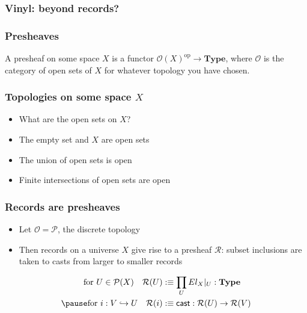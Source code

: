 \documentclass[tikz, 12pt]{beamer}
\begin{document}
\begin{frame}
  \frametitle{Vinyl: beyond records?}
\end{frame}

\begin{frame}
  \frametitle{Presheaves}\pause

  A presheaf on some space $X$ is a functor
  $\mathcal{O}(X)^{\mathrm{op}}\to\mathbf{Type}$, where $\mathcal{O}$ is the
  category of open sets of $X$ for whatever topology you have chosen.
\end{frame}

\begin{frame}
  \frametitle{Topologies on some space $X$}\pause

  \begin{itemize}
    \item What are the open sets on $X$?\pause
    \item The empty set and $X$ are open sets\pause
    \item The union of open sets is open\pause
    \item Finite intersections of open sets are open
  \end{itemize}
\end{frame}

\begin{frame}
  \frametitle{Records are presheaves}\pause

  \begin{itemize}
    \item Let $\mathcal{O} = \mathcal{P}$, the discrete topology\pause
    \item Then records on a universe $X$ give rise to a presheaf $\mathcal{R}$: subset inclusions are taken to casts from larger to smaller records
  \end{itemize}
  \pause

  \[
    \begin{aligned}
      \text{for } U\in\mathcal{P}(X)\quad \mathcal{R}(U) &:\equiv \prod_U El_X|_U : \mathbf{Type}\\ \pause
      \text{for } i : V\hookrightarrow U\quad \mathcal{R}(i) &:\equiv \mathsf{cast} : \mathcal{R}(U)\to\mathcal{R}(V)
    \end{aligned}
  \]
\end{frame}
\end{document}
